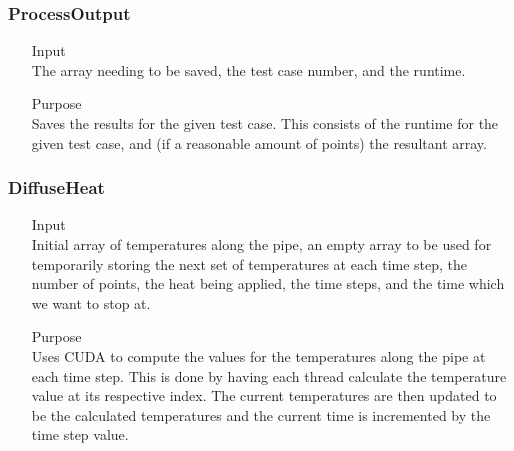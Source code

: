 \documentclass[11pt,a4paper]{article}
\begin{document}
\subsubsection{ProcessOutput}
\begin{itemize}
	\item[Input] \hfill\\
	The array needing to be saved, the test case number, and the runtime.
	\item[Purpose] \hfill\\
	Saves the results for the given test case. This consists of the runtime for the given test case, and (if a reasonable amount of points) the resultant array.
\end{itemize}

\subsubsection{DiffuseHeat}
\begin{itemize}
	\item[Input] \hfill\\
	Initial array of temperatures along the pipe, an empty array to be used for temporarily storing the next set of temperatures at each time step, the number of points, the heat being applied, the time steps, and the time which we want to stop at.
	\item[Purpose] \hfill\\
	Uses CUDA to compute the values for the temperatures along the pipe at each time step. This is done by having each thread calculate the temperature value at its respective index. The current temperatures are then updated to be the calculated temperatures and the current time is incremented by the time step value.
\end{itemize}
\end{document}
